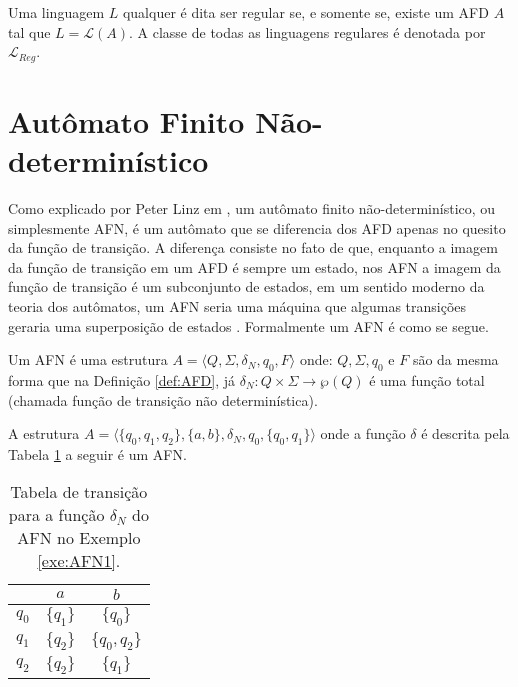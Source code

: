 \begin{definition}\label{def:LinguagensRegulares}
	Uma linguagem $L$ qualquer é dita ser regular se, e somente se, existe um AFD $A$ tal que $L = \mathcal{L}(A)$. A classe de todas as linguagens regulares é denotada por $\mathcal{L}_{Reg}$.
\end{definition}

\section{Autômato Finito Não-determinístico}\label{sec:AFN}

Como explicado por Peter Linz em \cite{linz2006}, um autômato finito não-determinístico, ou simplesmente AFN, é um autômato que se diferencia dos AFD apenas no quesito da função de transição. A diferença consiste no fato de que, enquanto a imagem da função de transição em um AFD é sempre um estado, nos AFN a imagem da  função de transição é um subconjunto de estados, em um sentido moderno da teoria dos autômatos, um AFN seria uma máquina que algumas transições geraria uma superposição de estados \cite{valdi2020phd}. Formalmente um AFN é como se segue.

\begin{definition}\label{def:AFN}
	Um AFN é uma estrutura $A = \langle Q, \Sigma, \delta_N, q_0, F\rangle$ onde: $Q, \Sigma, q_0$ e $F$ são da mesma forma que na Definição \ref{def:AFD}, já $\delta_N : Q \times \Sigma \rightarrow \wp(Q)$ é uma função total (chamada função de transição não determinística).
\end{definition}

\begin{example}\label{exe:AFN1}
	A estrutura $A = \langle \{q_0, q_1, q_2\}, \{a, b\}, \delta_N, q_0, \{q_0, q_1\}  \rangle$ onde a função $\delta$ é descrita pela Tabela \ref{tab:DeltaAFN1} a seguir é um AFN.
	
	\begin{table}[h]
		\centering
		\begin{tabular}{c|cc}
			\backslashbox{$Q$}{$\Sigma$}	& $a$ & $b$\\ \hline
			$q_0$  & $\{q_1\}$ & $\{q_0\}$\\
			$q_1$  & $\{q_2\}$ & $\{q_0, q_2\}$\\
			$q_2$  & $\{q_2\}$ & $\{q_1\}$\\ \hline
		\end{tabular}
		\caption{Tabela de transição para a função $\delta_N$ do AFN no Exemplo \ref{exe:AFN1}.}
		\label{tab:DeltaAFN1}
	\end{table}
\end{example}

